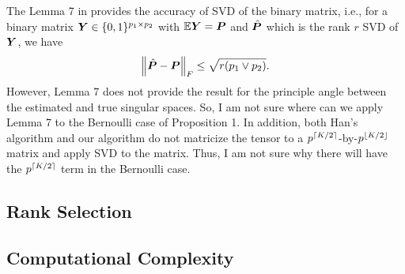 \documentclass[lettersize,journal]{IEEEtran}
\theoremstyle{definition}
\theoremstyle{definition}
\DeclarePairedDelimiter{\ceil}{\lceil}{\rceil}
\DeclarePairedDelimiter{\floor}{\lfloor}{\rfloor}
\begin{document}
{The Lemma 7 in \cite{gao2018community} provides the accuracy of SVD of the binary matrix, i.e., for a binary matrix $\bm Y \in \{0,1\}^{p_1 \times p_2}$ with $\mathbb{E} \bm Y = \bm{P}$ and  $\hat {\bm{P}}$ which is the rank $r$ SVD of $\bm Y$, we have
\begin{equation}
    \left\lVert\hat {\bm{P}} - \bm{P}\right\rVert_F \leq \sqrt{r (p_1 \vee p_2)}.
\end{equation}
However, Lemma 7 does not provide the result for the principle angle between the estimated and true singular spaces. So, I am not sure where can we apply Lemma 7 to the Bernoulli case of Proposition 1. In addition, both Han's algorithm and our algorithm do not matricize the tensor to a $p^{\ceil{K/2}}$-by-$p^{\floor{K/2}}$ matrix and apply SVD to the matrix. Thus, I am not sure why there will have the $p^{\ceil{K/2}}$ term in the Bernoulli case.

}

{
\color{red}
\subsection{Rank Selection}
\subsection{Computational Complexity}
}





\end{document}
